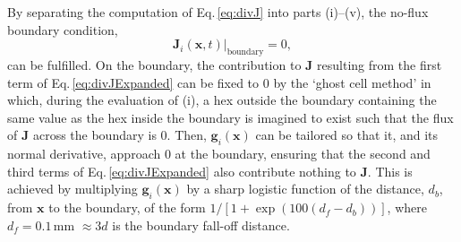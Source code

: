 \documentclass[9pt,lineno]{elife}
\newcommand{\MPtwo}[1]{\textcolor{colmptwo}{#1}}
\newcommand{\mb}[1]{\mathbf{#1}}
\begin{document}
By separating the computation of Eq.\,\ref{eq:divJ} into parts (i)--(v), the
no-flux boundary condition,
%
\begin{equation}
  \label{eq:noflux}
  \mb{J}_i(\mb{x},t)\big\rvert_{\mathrm{boundary}} = 0,
\end{equation}
%
can be fulfilled. On the boundary, the contribution to $\mb{J}$ resulting from
the first term of Eq.\,\ref{eq:divJExpanded} can be fixed to 0 by the `ghost
cell method' in which, during the evaluation of (i), a hex outside the
boundary containing the same value as the hex inside the boundary is imagined
to exist such that the flux of $\mb{J}$ across the boundary is 0. Then,
$\mb{g}_i(\mb{x})$ can be tailored so that it, and its normal derivative,
approach 0 at the boundary, ensuring that the second and third terms of
Eq.\,\ref{eq:divJExpanded} also contribute nothing to $\mb{J}$. This is
achieved by \MPtwo{multiplying} $\mb{g}_i(\mb{x})$ \MPtwo{by} a sharp logistic
function of the distance, $d_b$, from $\mb{x}$ to the boundary, \MPtwo{of the
  form $1/[1 + \exp(100(d_f-d_b))]$, where $d_f=0.1$\,mm $\approx 3d$ is the
  boundary fall-off distance}.
\end{document}
